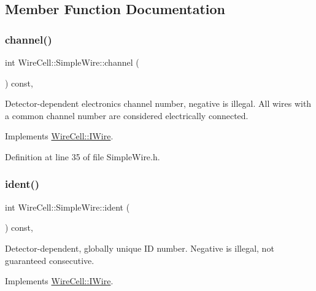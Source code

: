\subsection{Member Function Documentation}
\mbox{\label{class_wire_cell_1_1_simple_wire_afc85442561cf9421725bde79eb55b611}} 
\subsubsection{\texorpdfstring{channel()}{channel()}}
{\footnotesize\ttfamily int Wire\+Cell\+::\+Simple\+Wire\+::channel (\begin{DoxyParamCaption}{ }\end{DoxyParamCaption}) const\hspace{0.3cm}{\ttfamily [inline]}, {\ttfamily [virtual]}}

Detector-\/dependent electronics channel number, negative is illegal. All wires with a common channel number are considered electrically connected. 

Implements \hyperlink{class_wire_cell_1_1_i_wire_a24de34af80ad78b15137adb196ed1189}{Wire\+Cell\+::\+I\+Wire}.



Definition at line 35 of file Simple\+Wire.\+h.

\mbox{\label{class_wire_cell_1_1_simple_wire_a7e7a70124200787e3b325351ab34ec8e}} 
\subsubsection{\texorpdfstring{ident()}{ident()}}
{\footnotesize\ttfamily int Wire\+Cell\+::\+Simple\+Wire\+::ident (\begin{DoxyParamCaption}{ }\end{DoxyParamCaption}) const\hspace{0.3cm}{\ttfamily [inline]}, {\ttfamily [virtual]}}

Detector-\/dependent, globally unique ID number. Negative is illegal, not guaranteed consecutive. 

Implements \hyperlink{class_wire_cell_1_1_i_wire_a0e188a183e202dfb6dce25f6b16fc390}{Wire\+Cell\+::\+I\+Wire}.



